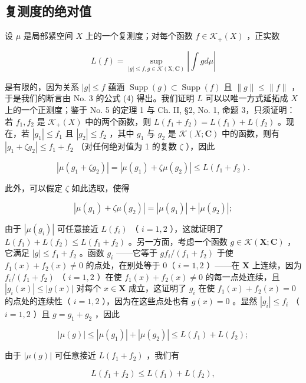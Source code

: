 \subsection{复测度的绝对值}

设 \(\mu\) 是局部紧空间 \(X\) 上的一个复测度；对每个函数 \(f \in \mathcal{K}_{+}(X)\) ，正实数

\[
L (f) = \sup _ {| g | \leqslant f, g \in \mathcal {K} (\mathrm{X}; \mathbf {C})} \left| \int g d \mu \right|\tag{11}
\]

是有限的，因为关系 \(|g| \leqslant f\) 蕴涵 \(\operatorname{Supp}(g) \subset \operatorname{Supp}(f)\) 且 \(\| g \| \leqslant \| f \|\) ，于是我们的断言由 No. 3 的公式 (4) 得出。我们证明 \(L\) 可以以唯一方式延拓成 \(X\) 上的一个正测度；鉴于 No. 5 的定理 1 与 Ch. II, §2, No. 1, 命题 3，只须证明：若 \(f_1, f_2\) 是 \(\mathcal{K}_+(X)\) 中的两个函数，则 \(L(f_1 + f_2) = L(f_1) + L(f_2)\) 。现在，若 \(|g_1| \leqslant f_1\) 且 \(|g_2| \leqslant f_2\) ，其中 \(g_1\) 与 \(g_2\) 是 \(\mathcal{K}(X; \mathbf{C})\) 中的函数，则有 \(|g_1 + \zeta g_2| \leqslant f_1 + f_2\) （对任何绝对值为 1 的复数 \(\zeta\) ），因此

\[
\left| \mu (g _ {1} + \zeta g _ {2}) \right| = \left| \mu (g _ {1}) + \zeta \mu (g _ {2}) \right| \leqslant L (f _ {1} + f _ {2}).
\]

此外，可以假定 \(\zeta\) 如此选取，使得

\[
\left| \mu (g _ {1}) + \zeta \mu (g _ {2}) \right| = \left| \mu (g _ {1}) \right| + \left| \mu (g _ {2}) \right|;
\]

由于 \(|\mu(g_i)|\) 可任意接近 \(L(f_i)\) （ \(i = 1,2\) ），这就证明了 \(L(f_1) + L(f_2) \leqslant L(f_1 + f_2)\) 。另一方面，考虑一个函数 \(g \in \mathcal{K}(\mathbf{X};\mathbf{C})\) ，它满足 \(|g| \leqslant f_1 + f_2\) 。函数 \(g_i\) ——它等于 \(g f_i / (f_1 + f_2)\) 于使 \(f_1(x) + f_2(x) \neq 0\) 的点处，在别处等于 0（ \(i = 1,2\) ）——在 \(\mathbf{X}\) 上连续，因为 \(f_i / (f_1 + f_2)\) （ \(i = 1,2\) ）在使 \(f_1(x) + f_2(x) \neq 0\) 的每一点处连续，且 \(|g_i(x)| \leqslant |g(x)|\) 对每个 \(x \in \mathbf{X}\) 成立，这证明了 \(g_i\) 在使 \(f_1(x) + f_2(x) = 0\) 的点处的连续性（ \(i = 1,2\) ），因为在这些点处也有 \(g(x) = 0\) 。显然 \(|g_i| \leqslant f_i\) （ \(i = 1,2\) ）且 \(g = g_1 + g_2\) ，因此

\[
| \mu (g) | \leqslant | \mu (g _ {1}) | + | \mu (g _ {2}) | \leqslant L (f _ {1}) + L (f _ {2});
\]

由于 \(|\mu(g)|\) 可任意接近 \(L(f_1 + f_2)\) ，我们有

\[
L (f _ {1} + f _ {2}) \leqslant L (f _ {1}) + L (f _ {2}),
\]

